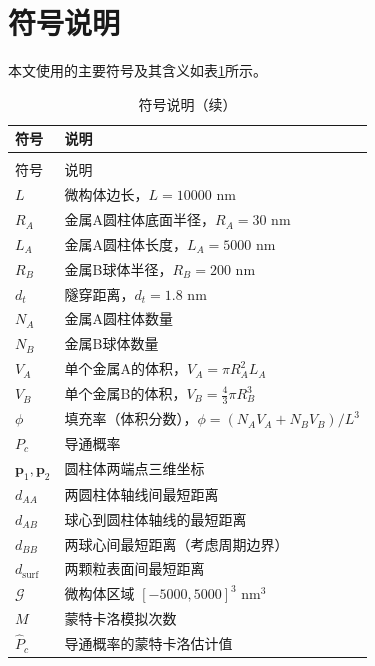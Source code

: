 
\section{符号说明}

本文使用的主要符号及其含义如表\ref{tab:符号说明}所示。

\begin{longtable}{>{\centering\arraybackslash}p{}>{\centering\arraybackslash}p{}}
  \caption{符号说明}
  \label{tab:符号说明} \\
  \toprule
  符号 & 说明 \\
  \midrule
  \endfirsthead
  \caption{符号说明（续）} \\
  \toprule
  符号 & 说明 \\
  \midrule
  \endhead
  \bottomrule
  \endfoot
  $L$ & 微构体边长，$L=10000$ nm \\
  $R_A$ & 金属A圆柱体底面半径，$R_A=30$ nm \\
  $L_A$ & 金属A圆柱体长度，$L_A=5000$ nm \\
  $R_B$ & 金属B球体半径，$R_B=200$ nm \\
  $d_t$ & 隧穿距离，$d_t=1.8$ nm \\
  $N_A$ & 金属A圆柱体数量 \\
  $N_B$ & 金属B球体数量 \\
  $V_A$ & 单个金属A的体积，$V_A=\pi R_A^2 L_A$ \\
  $V_B$ & 单个金属B的体积，$V_B=\frac{4}{3}\pi R_B^3$ \\
  $\phi$ & 填充率（体积分数），$\phi = (N_A V_A + N_B V_B) / L^3$ \\
  $P_c$ & 导通概率 \\
  $\mathbf{p}_1, \mathbf{p}_2$ & 圆柱体两端点三维坐标 \\
  $d_{AA}$ & 两圆柱体轴线间最短距离 \\
  $d_{AB}$ & 球心到圆柱体轴线的最短距离 \\
  $d_{BB}$ & 两球心间最短距离（考虑周期边界） \\
  $d_{\text{surf}}$ & 两颗粒表面间最短距离 \\
  $\mathcal{G}$ & 微构体区域 $[-5000,5000]^3$ nm$^3$ \\
  $M$ & 蒙特卡洛模拟次数 \\
  $\hat{P}_c$ & 导通概率的蒙特卡洛估计值 \\
\end{longtable}
